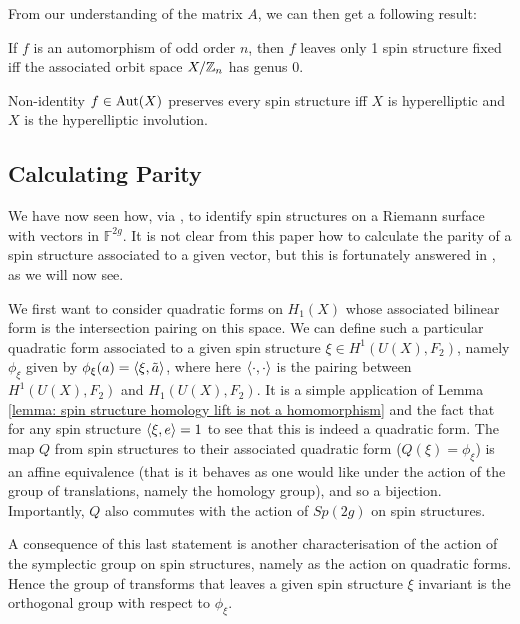 \documentclass{article}
\begin{document}
From our understanding of the matrix $A$, we can then get a following result:

\begin{prop}
	If $f$ is an automorphism of odd order $n$, then $f$ leaves only 1 spin structure fixed iff the associated orbit space $X/\mathbb{Z}_n$ has genus 0. 
\end{prop}

\begin{theorem}
	Non-identity $f \in \operatorname{Aut}(X)$ preserves every spin structure iff $X$ is hyperelliptic and $X$ is the hyperelliptic involution. 
\end{theorem}

\subsection{Calculating Parity}
We have now seen how, via \cite{Kallel2006}, to identify spin structures on a Riemann surface with vectors in $\mathbb{F}^{2g}$. It is not clear from this paper how to calculate the parity of a spin structure associated to a given vector, but this is fortunately answered in \cite{Johnson1980}, as we will now see. 

We first want to consider quadratic forms on $H_1(X)$ whose associated bilinear form is the intersection pairing on this space. We can define such a particular quadratic form associated to a given spin structure $\xi \in H^1(U(X), F_2)$, namely $\phi_\xi$ given by $\phi_\xi(a) = \left\langle \xi, \tilde{a} \right\rangle$, where here $\left\langle \cdot, \cdot \right\rangle$ is the pairing between $H^1(U(X), F_2)$ and $H_1(U(X), F_2)$. It is a simple application of Lemma \ref{lemma: spin structure homology lift is not a homomorphism} and the fact that for any spin structure $\left\langle \xi, e \right\rangle=1$ to see that this is indeed a quadratic form. The map $Q$ from spin structures to their associated quadratic form ($Q(\xi) = \phi_\xi$) is an affine equivalence (that is it behaves as one would like under the action of the group of translations, namely the homology group), and so a bijection. Importantly, $Q$ also commutes with the action of $Sp(2g)$ on spin structures.

\begin{remark}
	A consequence of this last statement is another characterisation of the action of the symplectic group on spin structures, namely as the action on quadratic forms. Hence the group of transforms that leaves a given spin structure $\xi$ invariant is the orthogonal group with respect to $\phi_\xi$. 
\end{remark} 
\end{document}
